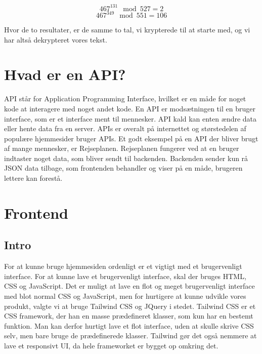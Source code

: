 \documentclass[a4paper,12pt]{extarticle}
\begin{document}
    \begin{equation}
        467^{131} \mod 527 = 2 \label{eq:decrypt-ex1}
    \end{equation}
    \begin{equation}
        467^{349} \mod 551 = 106 \label{eq:decrypt-ex2}
    \end{equation}

    Hvor de to resultater, er de samme to tal, vi krypterede til at starte med, og vi har altså dekrypteret vores tekst.

    \section{Hvad er en API?}\label{sec:hvad-er-en-api}
    API står for Application Programming Interface, hvilket er en måde for noget kode at interagere med noget andet kode.
    En API er modsætningen til en bruger interface, som er et interface ment til mennesker.
    API kald kan enten ændre data eller hente data fra en server.
    APIs er overalt på internettet og størstedelen af populære hjemmesider bruger APIs.
    Et godt eksempel på en API der bliver brugt af mange mennesker, er Rejseplanen.
    Rejseplanen fungerer ved at en bruger indtaster noget data, som bliver sendt til backenden.
    Backenden sender kun rå JSON data tilbage, som frontenden behandler og viser på en måde, brugeren lettere kan forestå.


    \section{Frontend}\label{sec:frontend}
    \subsection{Intro}
    For at kunne bruge hjemmesiden ordenligt er et vigtigt med et brugervenligt interface.
    For at kunne lave et brugervenligt interface, skal der bruges HTML, CSS og JavaScript.
    Det er muligt at lave en flot og meget brugervenligt interface med blot normal CSS og JavaScript,
    men for hurtigere at kunne udvikle vores produkt, valgte vi at bruge Tailwind CSS og JQuery i stedet.
    Tailwind CSS er et CSS framework, der han en masse prædefineret klasser, som kun har en bestemt funktion.
    Man kan derfor hurtigt lave et flot interface, uden at skulle skrive CSS selv, men bare bruge de prædefinerede klasser.
    Tailwind gør det også nemmere at lave et responsivt UI, da hele frameworket er bygget op omkring det.
\end{document}
